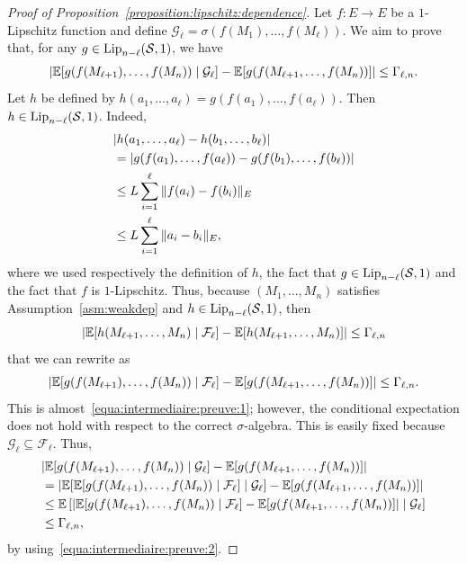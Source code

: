 \documentclass[11pt,a4paper]{article}
\theoremstyle{remark}
\theoremstyle{definition}
\theoremstyle{definition}
\DeclarePairedDelimiter{\abs}{\lvert}{\rvert}
\begin{document}
\begin{bibunit}[apalike]
\begin{proof}[Proof of Proposition~\ref{proposition:lipschitz:dependence}]
Let $f:E\rightarrow E$ be a $1$-Lipschitz function and define $\mathcal{G}_\ell=\sigma(f(M_1),\dots,f(M_\ell))$. We aim to prove that, for any $g\in {\rm Lip}_{n-\ell}(\mathcal{S},1)$, we have
\begin{equation}
\abs{ \mathbb{E}[g(f(M_{\ell+1}),\dots,f(M_n)) \mid \mathcal{G}_\ell] - \mathbb{E}[g(f(M_{\ell+1},\dots,f(M_n))] } \leq \Gamma_{\ell,n}.
\label{equa:intermediaire:preuve:1}
\end{equation}
Let $h$ be defined by $h(a_1,\dots,a_\ell) = g(f(a_1),\dots,f(a_\ell))$. Then $h\in {\rm Lip}_{n-\ell}(\mathcal{S},1)$. Indeed,
\begin{align*}
 & \abs{    h(a_1,\dots,a_\ell) -  h(b_1,\dots,b_\ell)  } \\
 & = \abs{  g(f(a_1),\dots,f(a_\ell)) -  g(f(b_1),\dots,f(b_\ell)) }\\
 & \leq L \sum_{i=1}^\ell \|f(a_i) - f(b_i)\|_E \\
 & \leq L \sum_{i=1}^\ell \|a_i - b_i\|_E,
\end{align*}
where we used respectively the definition of $h$, the fact that $g\in {\rm Lip}_{n-\ell}(\mathcal{S},1)$ and the fact that $f$ is $1$-Lipschitz. Thus, because $(M_1,\dots,M_n)$ satisfies Assumption~\ref{asm:weakdep} and $h\in {\rm Lip}_{n-\ell}(\mathcal{S},1)$, then
    \begin{equation*}
\abs{ \mathbb{E}[h(M_{\ell+1},\dots,M_n) \mid \mathcal{F}_\ell] - \mathbb{E}[h(M_{\ell+1},\dots,M_n)] } \leq \Gamma_{\ell,n}
\end{equation*}
that we can rewrite as
    \begin{equation}
\abs{ \mathbb{E}[g(f(M_{\ell+1}),\dots,f(M_n)) \mid \mathcal{F}_\ell] - \mathbb{E}[g(f(M_{\ell+1},\dots,f(M_n))] } \leq \Gamma_{\ell,n}.
\label{equa:intermediaire:preuve:2}
\end{equation}
This is almost~\eqref{equa:intermediaire:preuve:1}; however, the conditional expectation does not hold with respect to the correct $\sigma$-algebra. This is easily fixed because $\mathcal{G}_\ell \subseteq \mathcal{F}_\ell$. Thus,
\begin{align*}
& \abs{ \mathbb{E}[g(f(M_{\ell+1}),\dots,f(M_n)) \mid \mathcal{G}_\ell] - \mathbb{E}[g(f(M_{\ell+1},\dots,f(M_n))] } \\
& =
\abs{ \mathbb{E}[ \mathbb{E}[g(f(M_{\ell+1}),\dots,f(M_n)) \mid \mathcal{F}_\ell] \mid \mathcal{G}_\ell] - \mathbb{E}[g(f(M_{\ell+1},\dots,f(M_n))] }
\\
&
\leq
 \mathbb{E}\left[  \abs{ \mathbb{E}[g(f(M_{\ell+1}),\dots,f(M_n))\mid \mathcal{F}_\ell]- \mathbb{E}[g(f(M_{\ell+1},\dots,f(M_n))] } \mid \mathcal{G}_\ell \right]
\\
&
\leq \Gamma_{\ell,n},
\end{align*}
by using~\eqref{equa:intermediaire:preuve:2}.
\end{proof}


\end{bibunit}
\end{document}
